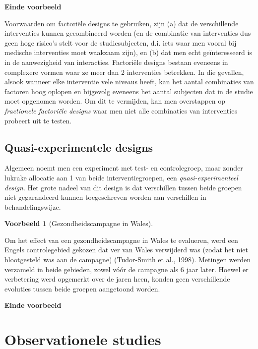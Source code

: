 \documentclass[
  12pt,dutch,coursenotes]{book}
\theoremstyle{definition}
\theoremstyle{definition}
\newtheorem{example}{Voorbeeld}[chapter]
\theoremstyle{definition}
\theoremstyle{remark}
\begin{document}
\textbf{Einde voorbeeld}

Voorwaarden om factoriële designs te gebruiken, zijn (a) dat de
verschillende interventies kunnen gecombineerd worden (en de combinatie van
interventies dus geen hoge risico's stelt voor de studiesubjecten, d.i. iets waar men vooral bij medische interventies moet waakzaam zijn), en (b) dat men
echt geïnteresseerd is in de aanwezigheid van interacties. Factoriële designs bestaan eveneens in complexere vormen waar ze meer dan 2 interventies betrekken. In die gevallen, alsook wanneer elke interventie vele niveaus heeft, kan het aantal combinaties van factoren hoog oplopen en bijgevolg eveneens het aantal subjecten dat in de studie moet opgenomen worden. Om dit te vermijden, kan men overstappen op \emph{fractionele factoriële designs} waar men niet alle combinaties van interventies probeert uit te testen.

\hypertarget{quasi-experimentele-designs}{%
\subsection{Quasi-experimentele designs}\label{quasi-experimentele-designs}}

Algemeen noemt men een experiment met test- en controlegroep, maar zonder
lukrake allocatie aan 1 van beide interventiegroepen, een \emph{quasi-experimenteel design}. Het grote nadeel van dit design is dat
verschillen tussen beide groepen niet gegarandeerd kunnen toegeschreven
worden aan verschillen in behandelingswijze.

\begin{example}[Gezondheidscampagne in Wales]
\protect\hypertarget{exm:unnamed-chunk-81}{}{\label{exm:unnamed-chunk-81} \iffalse (Gezondheidscampagne in Wales) \fi{} }
\end{example}

Om het effect van een gezondheidscampagne in Wales te evalueren, werd
een Engels controlegebied gekozen dat ver van Wales verwijderd was (zodat
het niet blootgesteld was aan de campagne) (Tudor-Smith et al., 1998).
Metingen werden verzameld in beide gebieden, zowel vóór de campagne
als 6 jaar later. Hoewel er verbetering werd opgemerkt over de jaren heen,
konden geen verschillende evoluties tussen beide groepen aangetoond worden.

\textbf{Einde voorbeeld}

\hypertarget{sec:observational}{%
\section{Observationele studies}\label{sec:observational}}
\end{document}
